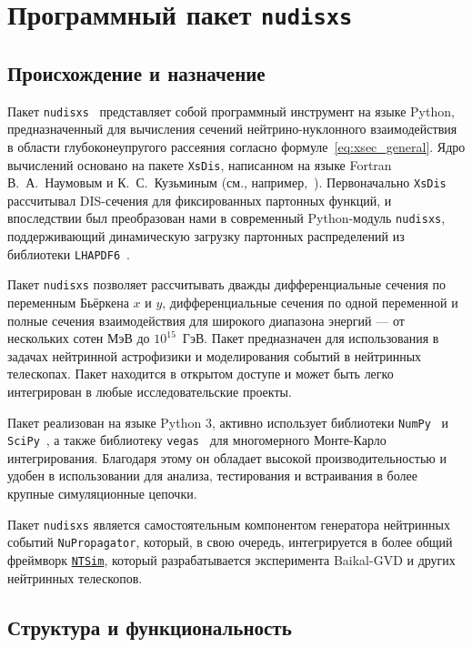 \section{Программный пакет \texttt{nudisxs}}

\subsection{Происхождение и назначение}

Пакет \texttt{nudisxs}~\cite{nudisxs2022} представляет собой программный инструмент на языке Python, предназначенный для вычисления сечений нейтрино-нуклонного взаимодействия в области глубоконеупругого рассеяния согласно формуле~\eqref{eq:xsec_general}. Ядро вычислений основано на пакете \texttt{XsDis}, написанном на языке Fortran В.~А.~Наумовым и К.~С.~Кузьминым (см., например,~\cite{nudisxs2022}). Первоначально \texttt{XsDis} рассчитывал DIS-сечения для фиксированных партонных функций, и впоследствии был преобразован нами в современный Python-модуль \texttt{nudisxs}, поддерживающий динамическую загрузку партонных распределений из библиотеки \texttt{LHAPDF6}~\cite{aartsenLHAPDF2020}.

Пакет \texttt{nudisxs} позволяет рассчитывать дважды дифференциальные сечения по переменным Бьёркена $x$ и $y$, дифференциальные сечения по одной переменной и полные сечения взаимодействия для широкого диапазона энергий — от нескольких сотен МэВ до $10^{15}$~ГэВ. Пакет предназначен для использования в задачах нейтринной астрофизики и моделирования событий в нейтринных телескопах. Пакет находится в открытом доступе и может быть легко интегрирован в любые исследовательские проекты.


Пакет реализован на языке Python 3, активно использует библиотеки \texttt{NumPy}~\cite{2020NumPy-Array} и \texttt{SciPy}~\cite{2020SciPy-NMeth}, а также библиотеку \texttt{vegas}~\cite{lepageVegas2021} для многомерного Монте-Карло интегрирования. Благодаря этому он обладает высокой производительностью и удобен в использовании для анализа, тестирования и встраивания в более крупные симуляционные цепочки.

Пакет \texttt{nudisxs} является самостоятельным компонентом генератора нейтринных событий \texttt{NuPropagator}, который, в свою очередь, интегрируется в более общий фреймворк \href{https://pypi.org/project/ntsim/}{\texttt{NTSim}}, который разрабатывается эксперимента Baikal-GVD и других нейтринных телескопов.

\subsection{Структура и функциональность}

